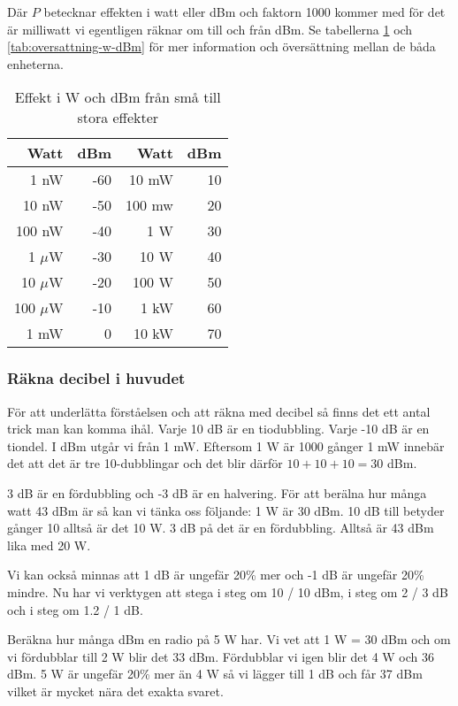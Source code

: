 Där $P$ betecknar effekten i watt eller dBm och faktorn 1000 kommer med för det är milliwatt vi egentligen räknar om till och från dBm. Se tabellerna \ref{tab:effekt-dbm} och \ref{tab:oversattning-w-dBm} för mer information och översättning mellan de båda enheterna.

\begin{table}[!h]
	\centering
 	\begin{tabular}{rr|rr}
	      Watt & dBm &   Watt & dBm \\ \hline
	      1 nW & -60 &  10 mW &  10 \\
	     10 nW & -50 & 100 mw &  20 \\
	    100 nW & -40 &    1 W &  30 \\
	  1 $\mu$W & -30 &   10 W &  40 \\
	 10 $\mu$W & -20 &  100 W &  50 \\
	100 $\mu$W & -10 &   1 kW &  60 \\
	      1 mW &   0 &  10 kW &  70
	\end{tabular}
	\caption{Effekt i W och dBm från små till stora effekter}
	\label{tab:effekt-dbm}
\end{table}


\subsubsection{Räkna decibel i huvudet}

För att underlätta förståelsen och att räkna med decibel så finns det ett antal trick man kan komma ihål. Varje 10 dB är en tiodubbling. Varje -10 dB är en tiondel. I dBm utgår vi från 1 mW. Eftersom 1 W är 1000 gånger 1 mW innebär det att det är tre 10-dubblingar och det blir därför $10+10+10=30$ dBm.

3 dB är en fördubbling och -3 dB är en halvering. För att berälna hur många watt 43 dBm är så kan vi tänka oss följande: 1 W är 30 dBm. 10 dB till betyder gånger 10 alltså är det 10 W. 3 dB på det är en fördubbling. Alltså är 43 dBm lika med 20 W. 

Vi kan också minnas att 1 dB är ungefär 20\% mer och -1 dB är ungefär 20\% mindre. Nu har vi verktygen att stega i steg om 10 / 10 dBm, i steg om 2 / 3 dB och i steg om 1.2 / 1 dB.

Beräkna hur många dBm en radio på 5 W har. Vi vet att 1 W = 30 dBm och om vi fördubblar till 2 W blir det 33 dBm. Fördubblar vi igen blir det 4 W och 36 dBm. 5 W är ungefär 20\% mer än 4 W så vi lägger till 1 dB och får 37 dBm vilket är mycket nära det exakta svaret.


